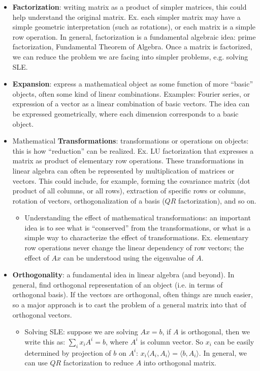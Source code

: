 \documentclass{report}
\begin{document}
\begin{itemize}
\item \textbf{Factorization}: writing matrix as a product of simpler matrices, this could help understand the original matrix. Ex. each simpler matrix may have a simple geometric interpretation (such as rotations), or each matrix is a simple row operation. In general, factorization is a fundamental algebraic idea: prime factorization, Fundamental Theorem of Algebra. Once a matrix is factorized, we can reduce the problem we are facing into simpler problems, e.g. solving SLE. 
	
\item \textbf{Expansion}: express a mathematical object as some function of more ``basic'' objects, often some kind of linear combinations. Examples: Fourier series, or expression of a vector as a linear combination of basic vectors. The idea can be expressed geometrically, where each dimension corresponds to a basic object. 

\item Mathematical \textbf{Transformations}: transformations or operations on objects: this is how ``reduction'' can be realized. Ex. LU factorization that expresses a matrix as product of elementary row operations. These transformations in linear algebra can often be represented by multiplication of matrices or vectors. This could include, for example, forming the covariance matrix (dot product of all columns, or all rows), extraction of specific rows or columns, rotation of vectors, orthogonalization of a basis ($QR$ factorization), and so on.  
\begin{itemize}
	\item Understanding the effect of mathematical transformations: an important idea is to see what is ``conserved'' from the transformations, or what is a simple way to characterize the effect of transformations. Ex. elementary row operations never change the linear dependency of row vectors; the effect of $Ax$ can be understood using the eigenvalue of $A$. 
\end{itemize} 

\item \textbf{Orthogonality}: a fundamental idea in linear algebra (and beyond). In general, find orthogonal representation of an object (i.e. in terms of orthogonal basis). If the vectors are orthogonal, often things are much easier, so a major approach is to cast the problem of a general matrix into that of orthogonal vectors. 
\begin{itemize}
	\item Solving SLE: suppose we are solving $Ax = b$, if $A$ is orthogonal, then we write this as: $\sum_i x_i A^i = b$, where $A^i$ is column vector. So $x_i$ can be easily determined by projection of $b$ on $A^i$: $x_i \langle A_i, A_i \rangle = \langle b, A_i \rangle$. In general, we can use $QR$ factorization to reduce $A$ into orthogonal matrix. 
	

\end{itemize}
\end{itemize}
\end{document}

